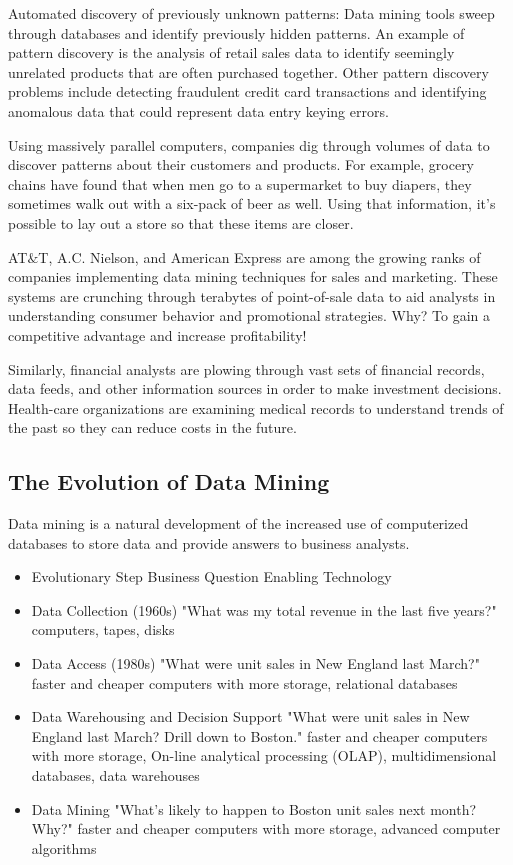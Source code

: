 Automated discovery of previously unknown patterns: Data mining tools sweep through databases and identify previously hidden patterns. An example of pattern discovery is the analysis of retail sales data to identify seemingly unrelated products that are often purchased together. Other pattern discovery problems include detecting fraudulent credit card transactions and identifying anomalous data that could represent data entry keying errors.

Using massively parallel computers, companies dig through volumes of data to discover patterns about their customers and products. For example, grocery chains have found that when men go to a supermarket to buy diapers, they sometimes walk out with a six-pack of beer as well. Using that information, it's possible to lay out a store so that these items are closer.

AT$\&$T, A.C. Nielson, and American Express are among the growing ranks of companies implementing data mining techniques for sales and marketing. These systems are crunching through terabytes of point-of-sale data to aid analysts in understanding consumer behavior and promotional strategies. Why? To gain a competitive advantage and increase profitability!

Similarly, financial analysts are plowing through vast sets of financial records, data feeds, and other information sources in order to make investment decisions. Health-care organizations are examining medical records to understand trends of the past so they can reduce costs in the future.

\subsection{The Evolution of Data Mining}
Data mining is a natural development of the increased use of computerized databases to store data and provide answers to business analysts.

\begin{itemize}
\item Evolutionary Step
 Business Question
 Enabling Technology

\item  Data Collection (1960s)
 "What was my total revenue in the last five years?"
 computers, tapes, disks

\item  Data Access (1980s)
 "What were unit sales in New England last March?"
 faster and cheaper computers with more storage, relational databases

\item Data Warehousing and Decision Support
 "What were unit sales in New England last March? Drill down to Boston."
 faster and cheaper computers with more storage, On-line analytical processing (OLAP), multidimensional databases, data warehouses

\item Data Mining
 "What's likely to happen to Boston unit sales next month? Why?"
 faster and cheaper computers with more storage, advanced computer algorithms

\end{itemize}

